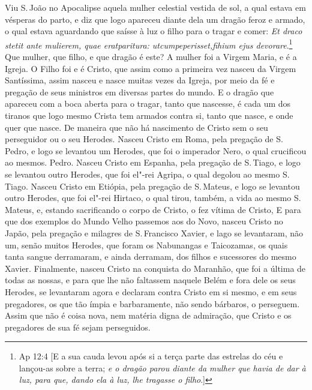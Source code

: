 Viu S.\,João no Apocalipse aquela mulher celestial vestida de sol, a qual
estava em vésperas do parto, e diz que logo apareceu diante dela um
dragão feroz e armado, o qual estava aguardando que saísse à luz o filho
para o tragar e comer: \emph{Et draco stetit ante mulierem, quae
eratparitura: utcumpeperisset,fihium ejus devorare}.\footnote{Ap 12:4 [E a sua cauda levou após si a terça parte das estrelas do céu e lançou-as sobre a terra; \emph{e
o dragão parou diante da mulher que havia de dar à luz, para que, dando ela à luz, lhe tragasse o filho}.]} Que
mulher, que filho, e que dragão é este? A mulher foi a Virgem Maria, e é
a Igreja. O Filho foi e é Cristo, que assim como a primeira vez nasceu
da Virgem Santíssima, assim nasceu e nasce muitas vezes da Igreja, por
meio da fé e pregação de seus ministros em diversas partes do mundo. E o
dragão que apareceu com a boca aberta para o tragar, tanto que nascesse,
é cada um dos tiranos que logo mesmo Crista tem armados contra si, tanto
que nasce, e onde quer que nasce. De maneira que não há nascimento de
Cristo sem o seu perseguidor ou o seu Herodes. Nasceu Cristo em Roma,
pela pregação de S.\,Pedro, e logo se levantou um Herodes, que foi o
imperador Nero, o qual crucificou ao mesmos. Pedro. Nasceu Cristo em
Espanha, pela pregação de S.\,Tiago, e logo se levantou outro Herodes,
que foi el"-rei Agripa, o qual degolou ao mesmo S.\,Tiago.
Nasceu Cristo em Etiópia, pela pregação de S.\,Mateus, e logo se levantou
outro Herodes, que foi el"-rei Hirtaco, o qual tirou, também, a vida ao
mesmo S.\,Mateus, e, estando sacrificando o corpo de Cristo, o fez vítima
de Cristo, E para que dos exemplos do Mundo Velho passemos aos do Novo,
nasceu Cristo no Japão, pela pregação e milagres de S.\,Francisco Xavier,
e lago se levantaram, não um, senão muitos Herodes, que foram os
Nabunangas e Taicozamas, os quais tanta sangue derramaram, e ainda
derramam, dos filhos e sucessores do mesmo Xavier. Finalmente, nasceu
Cristo na conquista do Maranhão, que foi a última de todas as nossas, e
para que lhe não faltassem naquele Belém e fora dele os seus Herodes, se
levantaram agora e declaram contra Cristo em si mesmo, e em seus
pregadores, os que tão ímpia e barbaramente, não sendo bárbaros, o
perseguem. Assim que não é coisa nova, nem matéria digna de admiração,
que Cristo e os pregadores de sua fé sejam perseguidos.

